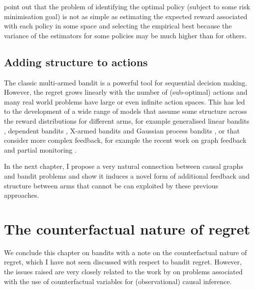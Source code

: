 \documentclass[11pt,a4paper,twoside]{report}
\theoremstyle{plain}
\theoremstyle{definition}
\begin{document}
\citet{Swaminathan2015} point out that the problem of identifying the optimal policy (subject to some risk minimisation goal) is not as simple as estimating the expected reward associated with each policy in some space and selecting the empirical best because the variance of the estimators for some policies may be much higher than for others.

\subsection{Adding structure to actions}
\label{sec:adding-structure-bandit-actions}

The classic multi-armed bandit is a powerful tool for sequential decision making. However, the regret grows linearly with the number of (sub-optimal) actions and many real world problems have large or even infinite action spaces. This has led to the development of a wide range of models that assume some structure across the reward distributions for different arms, for example generalised linear bandits \citep{filippi2010parametric}, dependent bandits \citep{Pandey2007}, X-armed bandits \citep{Bubeck2010} and Gaussian process bandits \citep{srinivas2009gaussian}, or that consider more complex feedback, for example the recent work on graph feedback \citep{Mannor2011,Lelarge2012,Alon2013,Buccapatnam2014,Kocak2014,Alon2015} and partial monitoring \citep{Piccolboni2001,Bartok2014}.

In the next chapter, I propose a very natural connection between causal graphs and bandit problems and show it induces a novel form of additional feedback and structure between arms that cannot be can exploited by these previous approaches. 

\section{The counterfactual nature of regret}
\label{sec:counterfactual-nature-regret}

We conclude this chapter on bandits with a note on the counterfactual nature of regret, which I have not seen discussed with respect to bandit regret. However, the issues raised are very closely related to the work by \citet{Dawid2000} on problems associated with the use of counterfactual variables for (observational) causal inference.
\end{document}
